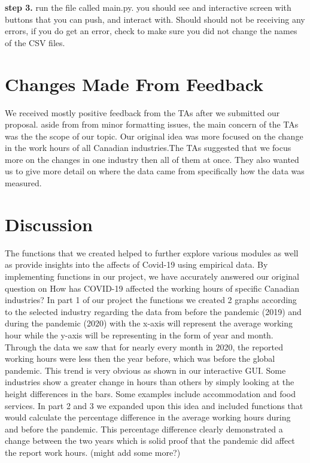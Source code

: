 \documentclass[fontsize=11pt]{article}
\begin{document}
\textbf{step 3.} run the file called main.py. 
you should see and interactive screen with buttons that you can push, and interact with. Should should not be receiving any errors, if you do get an error, check to make sure you did not change the names of the CSV files.
 
\section*{Changes Made From Feedback}  

We received mostly positive feedback from the TAs after we submitted our proposal. aside from from minor formatting issues, the main concern of the TAs was the the scope of our topic. Our original idea was more focused on the change in the work hours of all Canadian industries.The TAs suggested that we focus more on the changes in one industry then all of them at once. They also wanted us to give more detail on where the data came from specifically how the data was measured.
 
 
 
 
 
\section*{Discussion} 

The functions that we created helped to further explore various modules as well as provide insights into the affects of Covid-19 using empirical data. By implementing functions in our project, we have accurately answered our original question on How has COVID-19 affected the working hours of specific Canadian industries? In part 1 of our project the functions we created 2 graphs according to the selected industry regarding the data
from before the pandemic (2019) and during the pandemic (2020) with the x-axis will represent the average working hour while the y-axis
will be representing in the form of year and month. Through the data we saw that for nearly every month in 2020, the reported working hours were less then the year before, which was before the global pandemic. This trend is very obvious as shown in our interactive GUI. Some industries show a greater change in hours than others by simply looking at the height differences in the bars. Some examples include accommodation and food services. In part 2 and 3 we expanded upon this idea and included functions that would calculate the percentage difference in the average working hours during and before the pandemic. This percentage difference clearly demonstrated a change between the two years which is solid proof that the pandemic did affect the report work hours.  (might add some more?)
\end{document}
